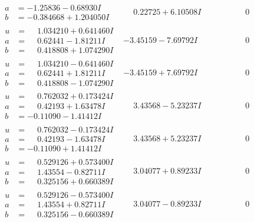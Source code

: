 \documentclass[1p]{elsarticle_modified}
\theoremstyle{definition}
\begin{document}
$$\begin{array}{c|c|c}
\begin{aligned}
a &= -1.25836 - 0.68930 I \\
b &= -0.384668 + 1.204050 I\end{aligned}
 & \phantom{-}0.22725 + 6.10508 I & \phantom{-0.000000 } 0 \\ \hline\begin{aligned}
u &= \phantom{-}1.034210 + 0.641460 I \\
a &= \phantom{-}0.62441 - 1.81211 I \\
b &= \phantom{-}0.418808 + 1.074290 I\end{aligned}
 & -3.45159 - 7.69792 I & \phantom{-0.000000 } 0 \\ \hline\begin{aligned}
u &= \phantom{-}1.034210 - 0.641460 I \\
a &= \phantom{-}0.62441 + 1.81211 I \\
b &= \phantom{-}0.418808 - 1.074290 I\end{aligned}
 & -3.45159 + 7.69792 I & \phantom{-0.000000 } 0 \\ \hline\begin{aligned}
u &= \phantom{-}0.762032 + 0.173424 I \\
a &= \phantom{-}0.42193 + 1.63478 I \\
b &= -0.11090 - 1.41412 I\end{aligned}
 & \phantom{-}3.43568 - 5.23237 I & \phantom{-0.000000 } 0 \\ \hline\begin{aligned}
u &= \phantom{-}0.762032 - 0.173424 I \\
a &= \phantom{-}0.42193 - 1.63478 I \\
b &= -0.11090 + 1.41412 I\end{aligned}
 & \phantom{-}3.43568 + 5.23237 I & \phantom{-0.000000 } 0 \\ \hline\begin{aligned}
u &= \phantom{-}0.529126 + 0.573400 I \\
a &= \phantom{-}1.43554 - 0.82711 I \\
b &= \phantom{-}0.325156 + 0.660389 I\end{aligned}
 & \phantom{-}3.04077 + 0.89233 I & \phantom{-0.000000 } 0 \\ \hline\begin{aligned}
u &= \phantom{-}0.529126 - 0.573400 I \\
a &= \phantom{-}1.43554 + 0.82711 I \\
b &= \phantom{-}0.325156 - 0.660389 I\end{aligned}
 & \phantom{-}3.04077 - 0.89233 I & \phantom{-0.000000 } 0 \\ \hline\begin{aligned}

\end{aligned}
\end{array}$$
\end{document}
